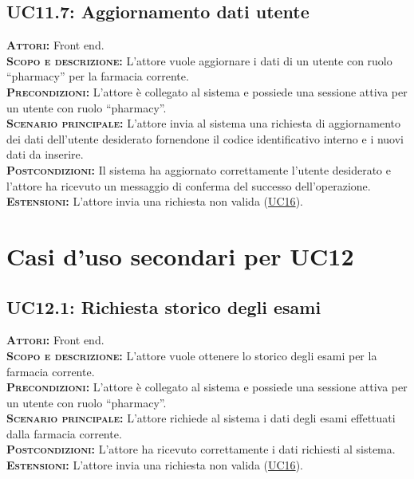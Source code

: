 \subsection{UC11.7: Aggiornamento dati utente}
\label{sec:UC117}
\textsc{\textbf{Attori:}} Front end.\\
\textsc{\textbf{Scopo e descrizione:}} L'attore vuole aggiornare i dati di un utente con ruolo ``pharmacy'' per la farmacia corrente.\\
\textsc{\textsc{\textbf{Precondizioni:}}} L'attore è collegato al sistema e possiede una sessione attiva per un utente con ruolo ``pharmacy''.\\
\textsc{\textbf{Scenario principale:}} L'attore invia al sistema una richiesta di aggiornamento dei dati dell'utente desiderato fornendone il codice identificativo interno e i nuovi dati da inserire.\\
\textsc{\textbf{Postcondizioni:}} Il sistema ha aggiornato correttamente l'utente desiderato e l'attore ha ricevuto un messaggio di conferma del successo dell'operazione.\\
\textsc{\textbf{Estensioni:}} L'attore invia una richiesta non valida (\hyperref[sec:UC16]{UC16}).

\section{Casi d'uso secondari per UC12}

\subsection{UC12.1: Richiesta storico degli esami}
\label{sec:UC121}
\textsc{\textbf{Attori:}} Front end.\\
\textsc{\textbf{Scopo e descrizione:}} L'attore vuole ottenere lo storico degli esami per la farmacia corrente.\\
\textsc{\textsc{\textbf{Precondizioni:}}} L'attore è collegato al sistema e possiede una sessione attiva per un utente con ruolo ``pharmacy''.\\
\textsc{\textbf{Scenario principale:}} L'attore richiede al sistema i dati degli esami effettuati dalla farmacia corrente.\\
\textsc{\textbf{Postcondizioni:}} L'attore ha ricevuto correttamente i dati richiesti al sistema.\\
\textsc{\textbf{Estensioni:}} L'attore invia una richiesta non valida (\hyperref[sec:UC16]{UC16}).

